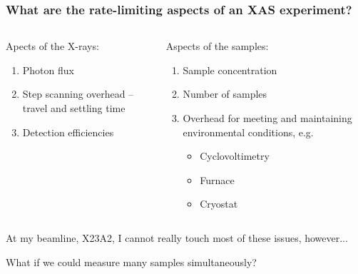 \documentclass[10pt, xcolor=x11names, compress, handout]{beamer}
\begin{document}
\begin{frame}
 \frametitle{What are the rate-limiting aspects of an XAS experiment?}%

  \begin{columns}[T]
    \begin{column}{0.5\linewidth}
      Apects of the X-rays:
      \begin{enumerate}
      \item Photon flux
      \item Step scanning overhead -- travel and settling time
      \item Detection efficiencies
      \end{enumerate}
    \end{column}
    \begin{column}{0.5\linewidth}
      Aspects of the samples:
      \begin{enumerate}
      \item Sample concentration
      \item Number of samples
      \item \alert{Overhead for meeting and maintaining environmental
        conditions}, e.g.
        \begin{itemize}
        \item Cyclovoltimetry
        \item Furnace
        \item Cryostat
        \end{itemize}
      \end{enumerate}      
    \end{column}
  \end{columns}

  \bigskip

  At my beamline, X23A2, I cannot really touch most of these issues,
  however...

  \begin{alertblock}{}
    \begin{center}
      What if we could measure many samples simultaneously?
    \end{center}
  \end{alertblock}
\end{frame}
\end{document}
